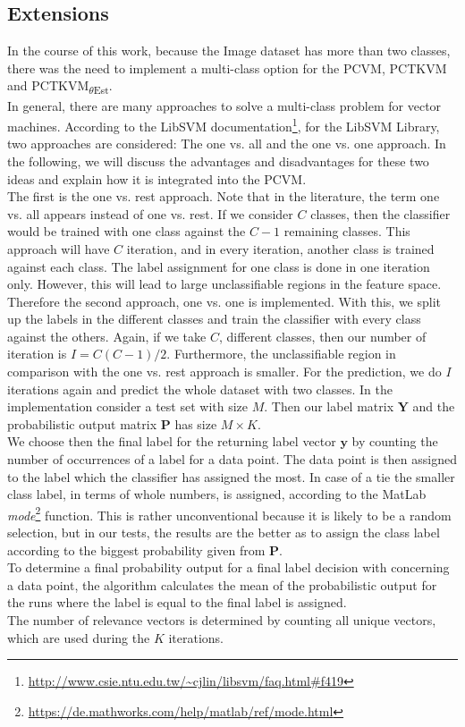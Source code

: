 \subsection{Extensions}\label{InSubSecExt}
In the course of this work, because the Image dataset has more than two classes, there was the need to implement a multi-class option for the \acs{PCVM}, \acs{PCTKVM} and \acs{PCTKVM}\textsubscript{$\theta$Est}.\\
In general, there are many approaches to solve a multi-class problem for vector machines.\cite[p. 113]{Abe.2010}
According to the LibSVM documentation\footnote{\url{http://www.csie.ntu.edu.tw/~cjlin/libsvm/faq.html\#f419}}, for the LibSVM Library, two approaches are considered: The one vs. all and the one vs. one approach.
In the following, we will discuss the advantages and disadvantages for these two ideas and explain how it is integrated into the \acs{PCVM}.\\
The first is the one vs. rest approach.
Note that in the literature, the term one vs. all appears instead of one vs. rest.
If we consider $C$ classes, then the classifier would be trained with one class against the $C-1$ remaining classes.
This approach will have $C$ iteration, and in every iteration, another class is trained against each class.
The label assignment for one class is done in one iteration only.
However, this will lead to large unclassifiable regions in the feature space.\cite[p. 114-116]{Abe.2010}\newline
Therefore the second approach, one vs. one is implemented.
With this, we split up the labels in the different classes and train the classifier with every class against the others.
Again, if we take $C$, different classes, then our number of iteration is $I=C(C-1)/2$.
Furthermore, the unclassifiable region in comparison with the one vs. rest approach is smaller.
For the prediction, we do $I$ iterations again and predict the whole dataset with two classes.\cite[p. 127-128]{Abe.2010}\newline
In the implementation consider a test set with size $M$.
Then our label matrix $\mathbf{Y}$ and the probabilistic output matrix $\mathbf{P}$ has size $M\times K$.\\
We choose then the final label for the returning label vector $\mathbf{y}$ by counting the number of occurrences of a label for a data point.
The data point is then assigned to the label which the classifier has assigned the most.
In case of a tie the smaller class label, in terms of whole numbers, is assigned, according to the MatLab \textit{mode}\footnote{\url{https://de.mathworks.com/help/matlab/ref/mode.html}} function.
This is rather unconventional because it is likely to be a random selection, but in our tests, the results are the better as to assign the class label according to the biggest probability given from $\mathbf{P}$.\\
To determine a final probability output for a final label decision with concerning a data point, the algorithm calculates the mean of the probabilistic output for the runs where the label is equal to the final label is assigned.\\
The number of relevance vectors is determined by counting all unique vectors, which are used during the $K$ iterations.

